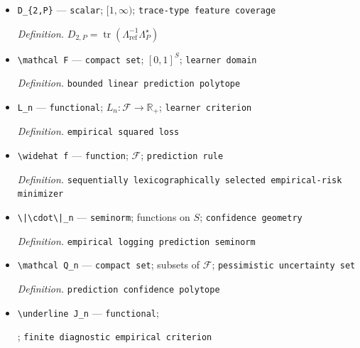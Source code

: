 \documentclass{article}
\begin{document}
\begin{itemize}
  \par\smallskip\noindent\emph{Definition.} \(D_P=\lambda_{\max}(\Lambda_{\mathrm{ref}}^{-1/2}\Lambda_P^\star\Lambda_{\mathrm{ref}}^{-1/2})\)
  \item \texttt{D\_\allowbreak{}\{2,\allowbreak{}P\}\allowbreak{}} --- \texttt{scalar}; \([1,\infty)\); \texttt{trace-\allowbreak{}type feature coverage}
  \par\smallskip\noindent\emph{Definition.} \(D_{2,P}=\operatorname{tr}(\Lambda_{\mathrm{ref}}^{-1}\Lambda_P^\star)\)
  \item \texttt{\textbackslash{}\allowbreak{}mathcal F} --- \texttt{compact set}; \([0,1]^S\); \texttt{learner domain}
  \par\smallskip\noindent\emph{Definition.} \texttt{bounded linear prediction polytope}
  \item \texttt{L\_\allowbreak{}n} --- \texttt{functional}; \(L_n:\mathcal F\to\mathbb R_+\); \texttt{learner criterion}
  \par\smallskip\noindent\emph{Definition.} \texttt{empirical squared loss}
  \item \texttt{\textbackslash{}\allowbreak{}widehat f} --- \texttt{function}; \(\mathcal F\); \texttt{prediction rule}
  \par\smallskip\noindent\emph{Definition.} \texttt{sequentially lexicographically selected empirical-\allowbreak{}risk minimizer}
  \item \texttt{\textbackslash{}\allowbreak{}|\textbackslash{}\allowbreak{}cdot\textbackslash{}\allowbreak{}|\_\allowbreak{}n} --- \texttt{seminorm}; functions on \(S\); \texttt{confidence geometry}
  \par\smallskip\noindent\emph{Definition.} \texttt{empirical logging prediction seminorm}
  \item \texttt{\textbackslash{}\allowbreak{}mathcal Q\_\allowbreak{}n} --- \texttt{compact set}; subsets of \(\mathcal F\); \texttt{pessimistic uncertainty set}
  \par\smallskip\noindent\emph{Definition.} \texttt{prediction confidence polytope}
  \item \texttt{\textbackslash{}\allowbreak{}underline J\_\allowbreak{}n} --- \texttt{functional}; \par\noindent {}\par\noindent; \texttt{finite diagnostic empirical criterion}

\end{itemize}
\end{document}
